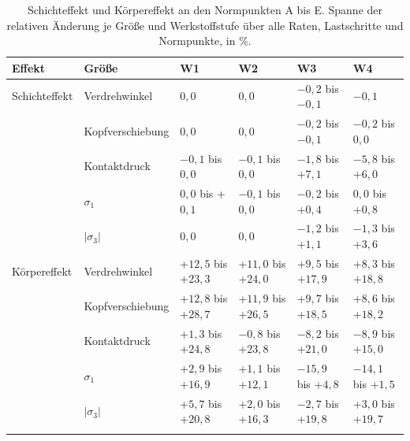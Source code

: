 		\begin{table}[htbp]
			\centering
			\caption{Schichteffekt und Körpereffekt an den Normpunkten A bis E. Spanne der relativen Änderung je Größe und Werkstoffstufe über alle Raten, Lastschritte und Normpunkte, in \%.}
			\label{tab:koerper_spannen}
			\footnotesize
			\setlength{\tabcolsep}{4pt}
			\begin{tabular}{llllll}
				\hline
				Effekt        & Größe                   & W1                      & W2                       & W3                        & W4                       \\
				\hline
				\arrayrulecolor{black!30}
				Schichteffekt & Verdrehwinkel           & $0{,}0$                 & $0{,}0$                  & $-$$0{,}2$ bis $-$$0{,}1$ & $-$$0{,}1$               \\
				\hline
				              & Kopfverschiebung        & $0{,}0$                 & $0{,}0$                  & $-$$0{,}2$ bis $-$$0{,}1$ & $-$$0{,}2$ bis $0{,}0$   \\
				\hline
				              & Kontaktdruck            & $-$$0{,}1$ bis $0{,}0$  & $-$$0{,}1$ bis $0{,}0$   & $-$$1{,}8$ bis +$7{,}1$   & $-$$5{,}8$ bis +$6{,}0$  \\
				\hline
				              & $\sigma_{\mathrm{1}}$   & $0{,}0$ bis +$0{,}1$    & $-$$0{,}1$ bis $0{,}0$   & $-$$0{,}2$ bis +$0{,}4$   & $0{,}0$ bis +$0{,}8$     \\
				\hline
				              & $|\sigma_{\mathrm{3}}|$ & $0{,}0$                 & $0{,}0$                  & $-$$1{,}2$ bis +$1{,}1$   & $-$$1{,}3$ bis +$3{,}6$  \\
						\hline
				Körpereffekt  & Verdrehwinkel           & +$12{,}5$ bis +$23{,}3$ & +$11{,}0$ bis +$24{,}0$  & +$9{,}5$ bis +$17{,}9$    & +$8{,}3$ bis +$18{,}8$   \\
				\hline
				              & Kopfverschiebung        & +$12{,}8$ bis +$28{,}7$ & +$11{,}9$ bis +$26{,}5$  & +$9{,}7$ bis +$18{,}5$    & +$8{,}6$ bis +$18{,}2$   \\
				\hline
				              & Kontaktdruck            & +$1{,}3$ bis +$24{,}8$  & $-$$0{,}8$ bis +$23{,}8$ & $-$$8{,}2$ bis +$21{,}0$  & $-$$8{,}9$ bis +$15{,}0$ \\
				\hline
				              & $\sigma_{\mathrm{1}}$   & +$2{,}9$ bis +$16{,}9$  & +$1{,}1$ bis +$12{,}1$   & $-$$15{,}9$ bis +$4{,}8$  & $-$$14{,}1$ bis +$1{,}5$ \\
				\hline
				              & $|\sigma_{\mathrm{3}}|$ & +$5{,}7$ bis +$20{,}8$  & +$2{,}0$ bis +$16{,}3$   & $-$$2{,}7$ bis +$19{,}8$  & +$3{,}0$ bis +$19{,}7$   \\
				\arrayrulecolor{black}
				\hline
			\end{tabular}
		\end{table}

